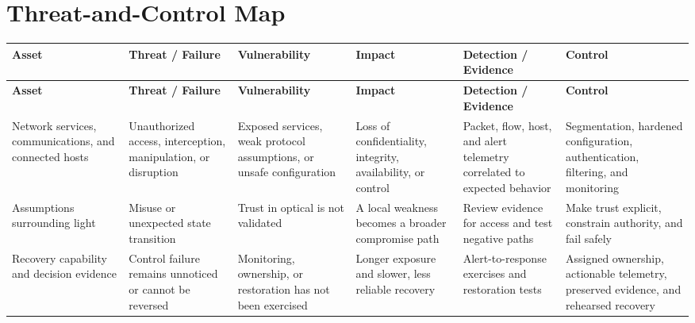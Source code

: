 \documentclass[11pt]{article}
\begin{document}
\section*{Threat-and-Control Map}
\begingroup\scriptsize\setlength{\tabcolsep}{2pt}
\begin{longtable}{>{\RaggedRight\arraybackslash}p{}>{\RaggedRight\arraybackslash}p{}>{\RaggedRight\arraybackslash}p{}>{\RaggedRight\arraybackslash}p{}>{\RaggedRight\arraybackslash}p{}>{\RaggedRight\arraybackslash}p{}}
\toprule\rowcolor{Navy}\color{white}\textbf{Asset} & \color{white}\textbf{Threat / Failure} & \color{white}\textbf{Vulnerability} & \color{white}\textbf{Impact} & \color{white}\textbf{Detection / Evidence} & \color{white}\textbf{Control}\\\midrule
\endfirsthead
\toprule\rowcolor{Navy}\color{white}\textbf{Asset} & \color{white}\textbf{Threat / Failure} & \color{white}\textbf{Vulnerability} & \color{white}\textbf{Impact} & \color{white}\textbf{Detection / Evidence} & \color{white}\textbf{Control}\\\midrule
\endhead
Network services, communications, and connected hosts & Unauthorized access, interception, manipulation, or disruption & Exposed services, weak protocol assumptions, or unsafe configuration & Loss of confidentiality, integrity, availability, or control & Packet, flow, host, and alert telemetry correlated to expected behavior & Segmentation, hardened configuration, authentication, filtering, and monitoring\\\midrule
Assumptions surrounding light & Misuse or unexpected state transition & Trust in optical is not validated & A local weakness becomes a broader compromise path & Review evidence for access and test negative paths & Make trust explicit, constrain authority, and fail safely\\\midrule
Recovery capability and decision evidence & Control failure remains unnoticed or cannot be reversed & Monitoring, ownership, or restoration has not been exercised & Longer exposure and slower, less reliable recovery & Alert-to-response exercises and restoration tests & Assigned ownership, actionable telemetry, preserved evidence, and rehearsed recovery\\\midrule
\bottomrule
\end{longtable}
\endgroup
\end{document}
